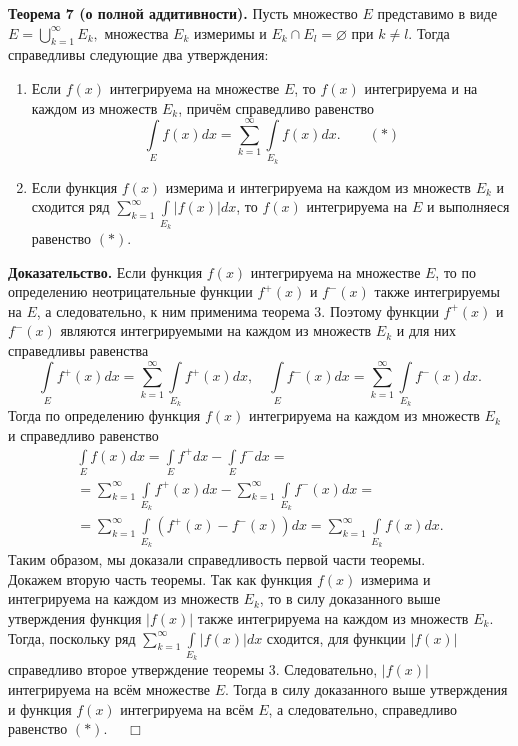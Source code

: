 \documentclass[12pt,a4paper, titlepage]{article}
\begin{document}
\textbf{Теорема 7 (о полной аддитивности).} Пусть множество $E$ представимо в виде $E = \bigcup\limits_{k=1}^\infty E_k,$ множества $E_k$ измеримы и $E_k \cap E_l = \varnothing$ при $k \neq l$. Тогда справедливы следующие два утверждения:\\
\begin{enumerate}
\item
Если $f(x)$ интегрируема на множестве $E$, то $f(x)$ интегрируема и на каждом из множеств $E_k$, причём справедливо равенство
$$
\int\limits_E f(x) dx = \sum_{k=1}^\infty \int\limits_{E_k} f(x) dx. \qquad (*)
$$
\item
Если функция $f(x)$ измерима и интегрируема на каждом из множеств $E_k$ и сходится ряд $\sum\limits_{k=1}^\infty \int\limits_{E_k} |f(x)| dx$, то $f(x)$ интегрируема на $E$ и выполняеся равенство $(*)$.
\end{enumerate}
\textbf{Доказательство.}
Если функция $f(x)$ интегрируема на множестве $E$, то по определению неотрицательные функции $f^+(x)$ и $f^-(x)$ также интегрируемы на $E$, а следовательно, к ним применима теорема 3. Поэтому функции $f^+(x)$ и $f^-(x)$ являются интегрируемыми на каждом из множеств $E_k$ и для них справедливы равенства
$$
\int\limits_E f^+(x) dx = \sum_{k=1}^\infty \int\limits_{E_k} f^+(x) dx, \quad \int\limits_E f^-(x) dx = \sum_{k=1}^\infty \int\limits_{E_k} f^-(x) dx. 
$$
Тогда по определению функция $f(x)$ интегрируема на каждом из множеств $E_k$ и справедливо равенство
\begin{multline*}
\int\limits_E f(x) dx = \int\limits_E f^+ dx - \int\limits_E f^- dx = \\
= \sum_{k=1}^\infty \int\limits_{E_k} f^+(x) dx - \sum_{k=1}^\infty \int\limits_{E_k} f^-(x) dx = \\
= \sum_{k=1}^\infty \int\limits_{E_k} (f^+(x) - f^-(x)) dx = \sum_{k=1}^\infty \int\limits_{E_k} f(x) dx.
\end{multline*}
Таким образом, мы доказали справедливость первой части теоремы.\\

Докажем вторую часть теоремы. Так как функция $f(x)$ измерима и интегрируема на каждом из множеств $E_k$, то в силу доказанного выше утверждения функция $|f(x)|$ также интегрируема на каждом из множеств $E_k$. Тогда, поскольку ряд $\sum\limits_{k=1}^\infty \int\limits_{E_k} |f(x)| dx$ сходится, для функции $|f(x)|$ справедливо второе утверждение теоремы 3. Следовательно, $|f(x)|$ интегрируема на всём множестве $E$. Тогда в силу доказанного выше утверждения и функция $f(x)$ интегрируема на всём $E$, а следовательно, справедливо равенство $(*)$. $\quad \Box$\\
\end{document}
